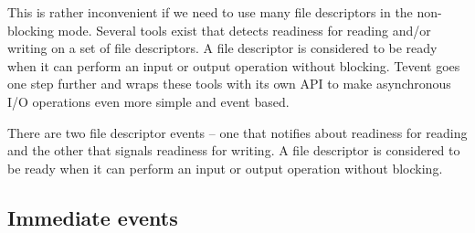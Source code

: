 This is rather inconvenient if we need to use many file descriptors in the
non-blocking mode. Several tools exist that detects readiness for reading and/or
writing on a set of file descriptors. A file descriptor is considered to be
ready when it can perform an input or output operation without blocking. Tevent
goes one step further and wraps these tools with its own API to make
asynchronous I/O operations even more simple and event based.

There are two file descriptor events -- one that notifies about readiness for
reading and the other that signals readiness for writing. A file descriptor is
considered to be ready when it can perform an input or output operation without
blocking.

\subsection{Immediate events}
